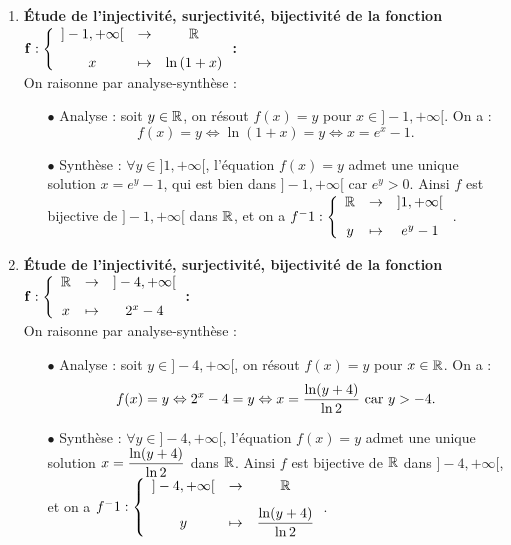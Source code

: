 \documentclass[a4paper, 11pt,reqno]{article}
\begin{document}
\begin{correction}
\begin{enumerate}
\begin{itemize}
		      \end{itemize}
		\item  \textbf{\'Etude de l'injectivit\'e, surjectivit\'e, bijectivit\'e de la fonction $\mathbf{f:\left\lbrace\begin{array}{ccc} \rbrack -1,+\infty\lbrack&\rightarrow& \R \vsec\\ x & \mapsto & \ln{(1+x)}\end{array}\right.}$:}\\
		      On raisonne par analyse-synth\`ese :
		      \begin{itemize}
			      \item[$\bullet$] Analyse : soit $y \in \mathbb{R}$, on r\'esout $f(x)=y$ pour $x \in ]-1,+\infty[$. On a :
				      $$f(x) = y \Leftrightarrow \ln(1+x) = y \Leftrightarrow x= e^x-1.$$
			      \item[$\bullet$] Synth\`ese : $\forall y \in ]1,+\infty[$, l'\'equation $f(x)=y$ admet une unique solution $x=e^y-1$, qui est bien dans $]-1,+\infty[$ car $e^y>0$. Ainsi $f$ est bijective de $]-1,+\infty[$ dans $\mathbb{R}$, et on a $f^-1 : \left\lbrace\begin{array}{ccc} \R & \rightarrow& ]1,+\infty[\vsec\\ y & \mapsto & e^y-1 \end{array}\right.$.
		      \end{itemize}
		\item  \textbf{\'Etude de l'injectivit\'e, surjectivit\'e, bijectivit\'e de la fonction $\mathbf{f:\left\lbrace\begin{array}{ccc} \R&\rightarrow& \rbrack -4,+\infty\lbrack \vsec\\ x & \mapsto & 2^x-4\end{array}\right.}$:}\\
		      On raisonne par analyse-synth\`ese :
		      \begin{itemize}
			      \item[$\bullet$] Analyse : soit $y \in ]-4,+\infty[$, on r\'esout $f(x)=y$ pour $x \in \mathbb{R}$. On a :
				      $$f(x) = y \Leftrightarrow 2^x-4= y \Leftrightarrow x=\displaystyle\frac{\ln(y+4)}{\ln 2} \textmd{ car } y>-4.$$
			      \item[$\bullet$] Synth\`ese : $\forall y \in ]-4,+\infty[$, l'\'equation $f(x)=y$ admet une unique solution $x=\displaystyle\frac{\ln(y+4)}{\ln 2}$ dans $\mathbb{R}$. Ainsi $f$ est bijective de $\mathbb{R}$ dans $]-4,+\infty[$, et on a $f^-1 : \left\lbrace\begin{array}{ccc} ]-4,+\infty[&\rightarrow& \R\vsec\\ y & \mapsto & \ddp\frac{\ln(y+4)}{\ln 2} \end{array}\right.$.

\end{itemize}
\end{enumerate}
\end{correction}
\end{document}
